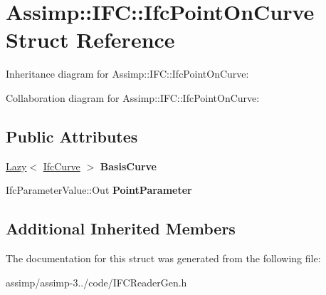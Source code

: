 \hypertarget{struct_assimp_1_1_i_f_c_1_1_ifc_point_on_curve}{\section{Assimp\+:\+:I\+F\+C\+:\+:Ifc\+Point\+On\+Curve Struct Reference}
\label{struct_assimp_1_1_i_f_c_1_1_ifc_point_on_curve}
}


Inheritance diagram for Assimp\+:\+:I\+F\+C\+:\+:Ifc\+Point\+On\+Curve\+:


Collaboration diagram for Assimp\+:\+:I\+F\+C\+:\+:Ifc\+Point\+On\+Curve\+:
\subsection*{Public Attributes}
\begin{DoxyCompactItemize}
\item 
\hypertarget{struct_assimp_1_1_i_f_c_1_1_ifc_point_on_curve_a8afdff7e97963668babdbd22595d5c9a}{\hyperlink{struct_assimp_1_1_s_t_e_p_1_1_lazy}{Lazy}$<$ \hyperlink{struct_assimp_1_1_i_f_c_1_1_ifc_curve}{Ifc\+Curve} $>$ {\bfseries Basis\+Curve}}\label{struct_assimp_1_1_i_f_c_1_1_ifc_point_on_curve_a8afdff7e97963668babdbd22595d5c9a}

\item 
\hypertarget{struct_assimp_1_1_i_f_c_1_1_ifc_point_on_curve_a29013a3c8fa735e3ab9d0c21279b619d}{Ifc\+Parameter\+Value\+::\+Out {\bfseries Point\+Parameter}}\label{struct_assimp_1_1_i_f_c_1_1_ifc_point_on_curve_a29013a3c8fa735e3ab9d0c21279b619d}

\end{DoxyCompactItemize}
\subsection*{Additional Inherited Members}


The documentation for this struct was generated from the following file\+:\begin{DoxyCompactItemize}
\item 
assimp/assimp-\/3../code/I\+F\+C\+Reader\+Gen.\+h\end{DoxyCompactItemize}
